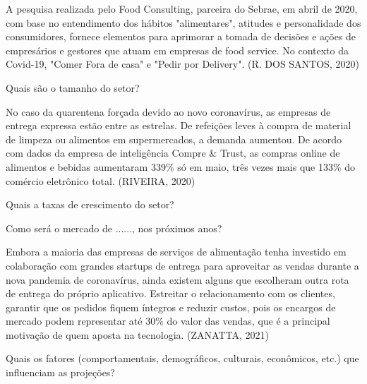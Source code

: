 A pesquisa realizada pelo Food Consulting, parceira do Sebrae, em abril de 2020, com base no entendimento dos hábitos "alimentares", atitudes e personalidade dos consumidores, fornece elementos para aprimorar a tomada de decisões e ações de empresários e gestores que atuam em empresas de food service. No contexto da Covid-19, "Comer Fora de casa" e "Pedir por Delivery". (R. DOS SANTOS, 2020)

\begin{commentA} \vspace{0.3cm} \noindent Quais são o tamanho do setor? \par \vspace{0.1cm} \end{commentA}

No caso da quarentena forçada devido ao novo coronavírus, as empresas de entrega expressa estão entre as estrelas. De refeições leves à compra de material de limpeza ou alimentos em supermercados, a demanda aumentou. De acordo com dados da empresa de inteligência Compre \& Trust, as compras online de alimentos e bebidas aumentaram 339\% só em maio, três vezes mais que 133\% do comércio eletrônico total. (RIVEIRA, 2020)

\begin{commentA} \vspace{0.3cm} \noindent Quais a taxas de crescimento do setor? \par \vspace{0.1cm} \end{commentA}


\begin{commentA} \vspace{0.3cm} \noindent Como será o mercado de ......, nos próximos anos? \par \vspace{0.1cm} \end{commentA}

Embora a maioria das empresas de serviços de alimentação tenha investido em colaboração com grandes startups de entrega para aproveitar as vendas durante a nova pandemia de coronavírus, ainda existem alguns que escolheram outra rota de entrega do próprio aplicativo. Estreitar o relacionamento com os clientes, garantir que os pedidos fiquem íntegros e reduzir custos, pois os encargos de mercado podem representar até 30\% do valor das vendas, que é a principal motivação de quem aposta na tecnologia. (ZANATTA, 2021)

\begin{commentA} \vspace{0.3cm} \noindent Quais os fatores (comportamentais, demográficos, culturais, econômicos, etc.) que influenciam as projeções? \par \vspace{0.1cm} \end{commentA}



